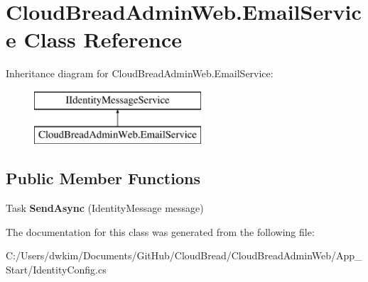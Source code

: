 \hypertarget{class_cloud_bread_admin_web_1_1_email_service}{}\section{Cloud\+Bread\+Admin\+Web.\+Email\+Service Class Reference}
\label{class_cloud_bread_admin_web_1_1_email_service}
Inheritance diagram for Cloud\+Bread\+Admin\+Web.\+Email\+Service\+:\begin{figure}[H]
\begin{center}
\leavevmode
\includegraphics[height=2.000000cm]{class_cloud_bread_admin_web_1_1_email_service}
\end{center}
\end{figure}
\subsection*{Public Member Functions}
\begin{DoxyCompactItemize}
\item 
Task {\bfseries Send\+Async} (Identity\+Message message)\hypertarget{class_cloud_bread_admin_web_1_1_email_service_ae9dfbb932db023912854d32e685f536b}{}\label{class_cloud_bread_admin_web_1_1_email_service_ae9dfbb932db023912854d32e685f536b}

\end{DoxyCompactItemize}


The documentation for this class was generated from the following file\+:\begin{DoxyCompactItemize}
\item 
C\+:/\+Users/dwkim/\+Documents/\+Git\+Hub/\+Cloud\+Bread/\+Cloud\+Bread\+Admin\+Web/\+App\+\_\+\+Start/Identity\+Config.\+cs\end{DoxyCompactItemize}
